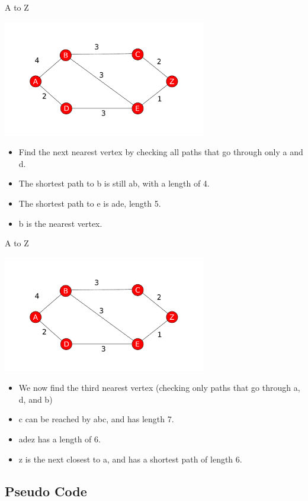 \documentclass{beamer}
\begin{document}
\begin{frame}{A to Z}
	\centerline{\includegraphics[width=3.5in]{weighted_ex_2.pdf}}
	\begin{itemize}
	\item
		Find the next nearest vertex by checking all paths that go through only a and d.
	\item
		The shortest path to b is still ab, with a length of 4.
	\item
		The shortest path to e is ade, length 5.
	\item
		b is the nearest vertex.
	\end{itemize}
\end{frame}

\begin{frame}{A to Z}
	\centerline{\includegraphics[width=3.5in]{weighted_ex_2.pdf}}
	\begin{itemize}
	\item
		We now find the third nearest vertex (checking only paths that go through a, d, and b)
	\item
		c can be reached by abc, and has length 7.
	\item
		adez has a length of 6.
	\item
		z is the next closest to a, and has a shortest path of length 6.
	\end{itemize}
\end{frame}

\subsection{Pseudo Code}
\end{document}
